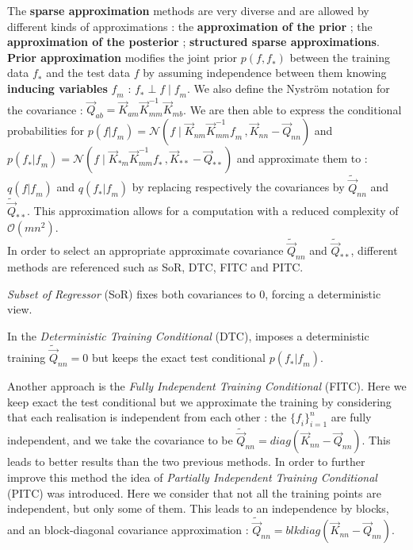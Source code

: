 The \textbf{sparse approximation} methods are very diverse and are allowed by different kinds of approximations : the \textbf{approximation of the prior} ; the \textbf{approximation of the posterior} ; \textbf{structured sparse approximations}. \\

\textbf{Prior approximation} modifies the joint prior $p(\mathit{f,f_*})$ between the training data $\mathit{f}_*$ and the test data $\mathit{f}$ by assuming independence between them knowing \textbf{inducing variables} $\mathit{f}_m$ : $\mathit{f}_* \perp \mathit{f} \; | \; \mathit{f}_m$. We also define the Nyström notation for the covariance : $\vec{Q}_{ab} = \vec{K}_{am} \vec{K}_{mm}^{-1} \vec{K}_{mb} $. We are then able to express the conditional probabilities for $p(\mathit{f} | \mathit{f}_m) = \mathcal{N}(\mathit{f} \; | \; \vec{K}_{nm}\vec{K}_{mm}^{-1}\mathit{f}_m \, , \vec{K}_{nn} - \vec{Q}_{nn})$ and  $p(\mathit{f}_* | \mathit{f}_m)  = \mathcal{N}(\mathit{f} \; | \; \vec{K}_{*m}\vec{K}_{mm}^{-1}\mathit{f}_* \, , \vec{K}_{**} - \vec{Q}_{**})$  and approximate them to : $q(\mathit{f} | \mathit{f}_m)$ and  $q(\mathit{f}_* | \mathit{f}_m)$ by replacing respectively the covariances by   $\tilde{\vec{Q}}_{nn}$ and $\tilde{\vec{Q}}_{**}$. This approximation allows for a computation with a reduced complexity of $\mathcal{O}(mn^2)$. \\

 In order to select an appropriate approximate covariance $\tilde{\vec{Q}}_{nn}$ and $\tilde{\vec{Q}}_{**}$, different methods are referenced such as  SoR, DTC, FITC and PITC. 
 
 \textit{Subset of Regressor} (SoR) fixes both covariances to $0$, forcing a deterministic view. 
 
 In the \textit{Deterministic Training Conditional} (DTC), imposes a deterministic training $\tilde{\vec{Q}}_{nn} = 0$ but keeps the exact test conditional $p(\mathit{f}_* | \mathit{f}_m)$. 
 
 Another approach is the \textit{Fully Independent Training Conditional} (FITC). Here we keep exact the test conditional but we approximate the training by considering that each realisation is independent from each other : the $\{\mathit{f}_i\}^n_{i=1}$ are fully independent, and we take the covariance to be $\tilde{\vec{Q}}_{nn} = diag(\vec{K}_{nn} - \vec{Q}_{nn} ) $. This leads to better results than the two previous methods. 
 In order to further improve this method the idea of \textit{Partially Independent Training Conditional} (PITC) was introduced. Here we consider that not all the training points are independent, but only some of them. This leads to an independence by blocks, and an block-diagonal covariance approximation : $\tilde{\vec{Q}}_{nn} = blkdiag(\vec{K}_{nn} - \vec{Q}_{nn} ) $. 
 
